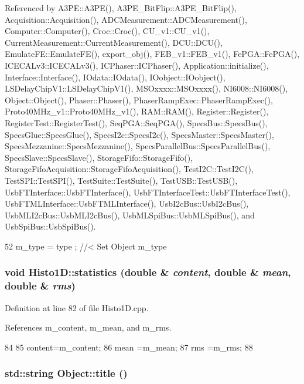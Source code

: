 Referenced by A3PE::A3PE(), A3PE\_\-BitFlip::A3PE\_\-BitFlip(), Acquisition::Acquisition(), ADCMeasurement::ADCMeasurement(), Computer::Computer(), Croc::Croc(), CU\_\-v1::CU\_\-v1(), CurrentMeasurement::CurrentMeasurement(), DCU::DCU(), EmulateFE::EmulateFE(), export\_\-obj(), FEB\_\-v1::FEB\_\-v1(), FePGA::FePGA(), ICECALv3::ICECALv3(), ICPhaser::ICPhaser(), Application::initialize(), Interface::Interface(), IOdata::IOdata(), IOobject::IOobject(), LSDelayChipV1::LSDelayChipV1(), MSOxxxx::MSOxxxx(), NI6008::NI6008(), Object::Object(), Phaser::Phaser(), PhaserRampExec::PhaserRampExec(), Proto40MHz\_\-v1::Proto40MHz\_\-v1(), RAM::RAM(), Register::Register(), RegisterTest::RegisterTest(), SeqPGA::SeqPGA(), SpecsBus::SpecsBus(), SpecsGlue::SpecsGlue(), SpecsI2c::SpecsI2c(), SpecsMaster::SpecsMaster(), SpecsMezzanine::SpecsMezzanine(), SpecsParallelBus::SpecsParallelBus(), SpecsSlave::SpecsSlave(), StorageFifo::StorageFifo(), StorageFifoAcquisition::StorageFifoAcquisition(), TestI2C::TestI2C(), TestSPI::TestSPI(), TestSuite::TestSuite(), TestUSB::TestUSB(), UsbFTInterface::UsbFTInterface(), UsbFTInterfaceTest::UsbFTInterfaceTest(), UsbFTMLInterface::UsbFTMLInterface(), UsbI2cBus::UsbI2cBus(), UsbMLI2cBus::UsbMLI2cBus(), UsbMLSpiBus::UsbMLSpiBus(), and UsbSpiBus::UsbSpiBus().


\begin{DoxyCode}
52 { m_type  = type  ; } //< Set Object m_type
\end{DoxyCode}
\hypertarget{classHisto1D_acc0d6f2080b0cfafc85ebc49cf0efc31}{
\subsubsection[{statistics}]{\setlength{\rightskip}{0pt plus 5cm}void Histo1D::statistics (double \& {\em content}, \/  double \& {\em mean}, \/  double \& {\em rms})}}
\label{classHisto1D_acc0d6f2080b0cfafc85ebc49cf0efc31}


Definition at line 82 of file Histo1D.cpp.

References m\_\-content, m\_\-mean, and m\_\-rms.


\begin{DoxyCode}
84                                      {
85   content=m_content;
86   mean   =m_mean;
87   rms    =m_rms;
88 }
\end{DoxyCode}
\hypertarget{classObject_a73a0f1a41828fdd8303dd662446fb6c3}{
\subsubsection[{title}]{\setlength{\rightskip}{0pt plus 5cm}std::string Object::title ()}}
\label{classObject_a73a0f1a41828fdd8303dd662446fb6c3}


